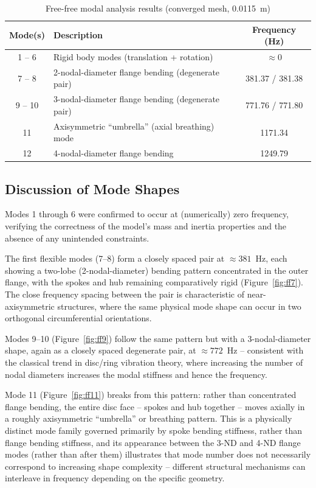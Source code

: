 \documentclass[11pt]{article}
\begin{document}
\begin{table}[H]
\centering
\caption{Free-free modal analysis results (converged mesh, 0.0115~m)}
\label{tab:freefree}
\begin{tabular}{clc}
\toprule
\textbf{Mode(s)} & \textbf{Description} & \textbf{Frequency (Hz)} \\
\midrule
1 -- 6  & Rigid body modes (translation + rotation) & $\approx 0$ \\
7 -- 8  & 2-nodal-diameter flange bending (degenerate pair) & 381.37 / 381.38 \\
9 -- 10 & 3-nodal-diameter flange bending (degenerate pair) & 771.76 / 771.80 \\
11      & Axisymmetric ``umbrella'' (axial breathing) mode & 1171.34 \\
12      & 4-nodal-diameter flange bending & 1249.79 \\
\bottomrule
\end{tabular}
\end{table}

\subsection{Discussion of Mode Shapes}

Modes 1 through 6 were confirmed to occur at (numerically) zero frequency, verifying
the correctness of the model's mass and inertia properties and the absence of any
unintended constraints.

The first flexible modes (7--8) form a closely spaced pair at $\approx 381$~Hz, each
showing a two-lobe (2-nodal-diameter) bending pattern concentrated in the outer flange,
with the spokes and hub remaining comparatively rigid (Figure~\ref{fig:ff7}). The close
frequency spacing between the pair is characteristic of near-axisymmetric structures,
where the same physical mode shape can occur in two orthogonal circumferential
orientations.

Modes 9--10 (Figure~\ref{fig:ff9}) follow the same pattern but with a
3-nodal-diameter shape, again as a closely spaced degenerate pair, at $\approx
772$~Hz -- consistent with the classical trend in disc/ring vibration theory, where
increasing the number of nodal diameters increases the modal stiffness and hence the
frequency.

Mode 11 (Figure~\ref{fig:ff11}) breaks from this pattern: rather than
concentrated flange bending, the entire disc face -- spokes and hub together -- moves
axially in a roughly axisymmetric ``umbrella'' or breathing pattern. This is a
physically distinct mode family governed primarily by spoke bending stiffness, rather
than flange bending stiffness, and its appearance between the 3-ND and 4-ND flange
modes (rather than after them) illustrates that mode number does not necessarily
correspond to increasing shape complexity -- different structural mechanisms can
interleave in frequency depending on the specific geometry.
\end{document}
